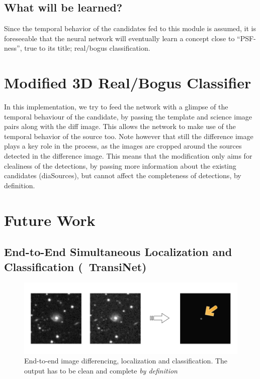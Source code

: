 \subsection{What will be learned?}
Since the temporal behavior of the candidates fed to this module is assumed, it is foreseeable that the neural network will eventually learn a concept close to ``PSF-ness'', true to its title; real/bogus classification.

\section{Modified 3D Real/Bogus Classifier}
\label{sec:modified}
In this implementation, we try to feed the network with a glimpse of the temporal behaviour of the candidate, by passing the template and science image pairs along with the diff image. This allows the network to make use of the temporal behavior of the source too.
Note however that still the difference image plays a key role in the process, as the images are cropped around the sources detected in the difference image. This means that the modification only aims for clealiness of the detections, by passing more information about the existing candidates (diaSources), but cannot affect the completeness of detections, by definition.

\section{Future Work}
\subsection{End-to-End Simultaneous Localization and Classification (~TransiNet)}

\begin{figure}[h]
  \centering
  \includegraphics[width=.8\textwidth]{material/transinet-teaser}
  \caption{End-to-end image differencing, localization and classification. The output has to be clean and complete \emph{by definition} }
  \label{fig:transinet-teaser}
\end{figure}

